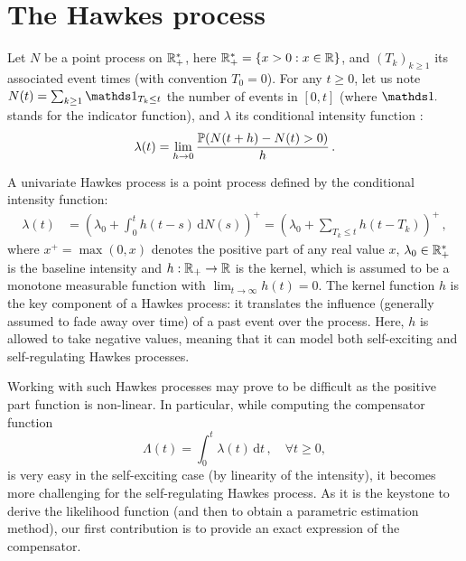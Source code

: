 \section{The Hawkes process}\label{sec:chap1_general}

Let $N$ be a point process on ${\mathbb R}_+^*$, here \({\mathbb R}_+^* = \left\{ x>0 : x \in {\mathbb R} \right\}\), and $(T_k)_{k\geq 1}$ its associated event times (with convention $T_0 = 0$).
For any $t \geq 0$, let us note $N(t) = \sum_{k\geq 1}{\II_{T_k \leq t }}$ the number of events in $[0,t]$
(where \(\II_{\cdot}\) stands for the indicator function),
and $\lambda$ its conditional intensity function \parencite{DaleyV1}:
\begin{equation*}
    \lambda(t) = \lim_{h\to 0}{\frac{{\mathbb P}(N(t+h) - N(t) > 0)}{h}}\,.
\end{equation*}

A univariate Hawkes process is a point process defined by the conditional intensity function:
\begin{align}
    \lambda(t) &= \left(\lambda_0 + \int_{0}^{t}{h(t-s)\,\mathrm{d}N(s)}\right)^+
    = \left(\lambda_0 + \sum_{T_k \leq t}{h(t-T_k)}\right)^+\,,
    \label{eq:chap1_general_hawkes}
\end{align}
where $x^+ = \max(0,x)$ denotes the positive part of any real value $x$,
$\lambda_0\in{\mathbb R}_+^*$ is the baseline intensity and
\(h : {\mathbb R}_+ \to {\mathbb R}\) is the kernel, which is assumed to be a monotone measurable function with $\lim_{t\to\infty} h(t) = 0$.
The kernel function $h$ is the key component of a Hawkes process:
it translates the influence (generally assumed to fade away over time) of a past event over the process.
Here, $h$ is allowed to take negative values, meaning that it can model both self-exciting and self-regulating Hawkes processes.

Working with such Hawkes processes may prove to be difficult as the positive part function is non-linear.
In particular, while computing the compensator function \parencite{DaleyV1}
\begin{equation}
    \Lambda(t) = \int_{0}^{t}{\lambda(t)\,\mathrm{d}t}\,,
    \quad \forall t \geq 0,
    \label{eq:chap1_compensator}
\end{equation}
is very easy in the self-exciting case (by linearity of the intensity), it becomes more challenging for the self-regulating Hawkes process.
As it is the keystone to derive the likelihood function (and then to obtain a parametric estimation method), our first contribution is to provide an exact expression of the compensator.

